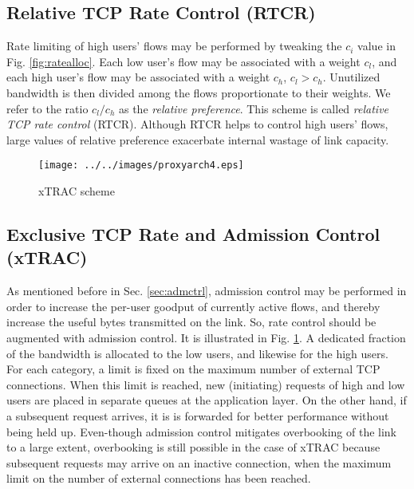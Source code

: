 \documentclass[conference]{../../IEEEtran}
\begin{document}
\subsection{Relative TCP Rate Control (RTCR)}

Rate limiting of high users' flows may be performed by tweaking the $c_i$ value in Fig. \ref{fig:ratealloc}. Each low user's flow may be associated with a weight $c_l$, and each high user's flow may be associated with a weight $c_h$, $c_l > c_h$. Unutilized bandwidth is then divided among the flows proportionate to their weights. We refer to the ratio $c_l / c_h$ as the \emph{relative preference}. This scheme is called \emph{relative TCP rate control} (RTCR). Although RTCR helps to control high users' flows, large values of relative preference exacerbate internal wastage of link capacity.

\begin{figure}[hbt]
\centering
  \texttt{[image: ../../images/proxyarch4.eps]}
 \caption{xTRAC scheme}
 \label{fig:htcrsq}
\end{figure}

\subsection{Exclusive TCP Rate and Admission Control (xTRAC)}

As mentioned before in Sec. \ref{sec:admctrl}, admission control may be performed in order to increase the per-user goodput of currently active flows, and thereby increase the useful bytes transmitted on the link. So, rate control should be augmented with admission control. It is illustrated in Fig. \ref{fig:htcrsq}.  A dedicated fraction of the bandwidth is allocated to the low users, and likewise for the high users. For each category, a limit is fixed on the maximum number of external TCP connections. When this limit is reached, new (initiating) requests of high and low users are placed in separate queues at the application layer. On the other hand, if a subsequent request arrives, it is is forwarded for better performance without being held up.
Even-though admission control mitigates overbooking of the link to a large extent, overbooking is still possible in the case of xTRAC because subsequent requests may arrive on an inactive connection, when the maximum limit on the number of external connections has been reached.
\end{document}
